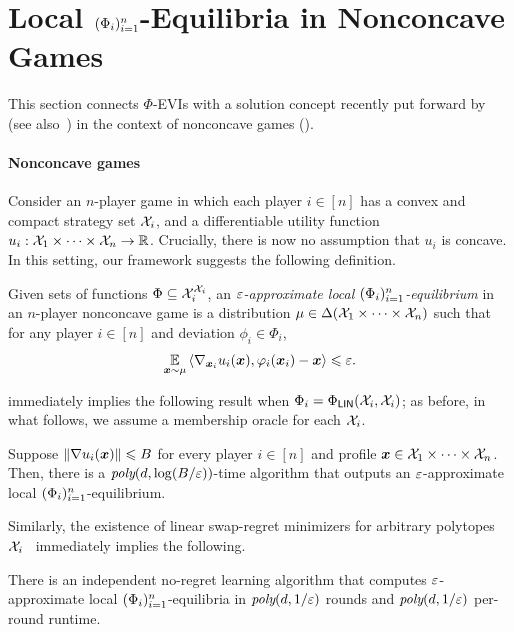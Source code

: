 \section{Local \texorpdfstring{$(\Phi_i)_{i=1}^n$}{Phi}-Equilibria in Nonconcave Games}
\label{sec:localPhi}

This section connects $\Phi$-EVIs with a solution concept recently put forward by~\citet{Cai24:Tractable} (see also~\citet{Ahunbay25:First}) in the context of nonconcave games ().

\paragraph{Nonconcave games} Consider an $n$-player game in which each player $i \in [n]$ has a convex and compact strategy set ${\mathcal{X}}_i$, and a differentiable utility function $u_i : {\mathcal{X}}_1 \times \dots \times {\mathcal{X}}_n \to \mathbb R$. Crucially, there is now no assumption that $u_i$ is concave. In this setting, our framework suggests the following definition.
\begin{definition}
    \label{def:localPhi}
    Given sets of functions $\Phi \subseteq  {\mathcal{X}}_i^{{\mathcal{X}}_i}$, an {\em $\varepsilon$-approximate local $(\Phi_i)_{i=1}^n$-equilibrium} in an $n$-player nonconcave game is a distribution $\mu \in \Delta({\mathcal{X}}_1 \times \dots \times {\mathcal{X}}_n)$ such that for any player $i \in [n]$ and deviation $\phi_i \in \Phi_i$,
    \begin{align*}
        \E_{\vx\sim\mu} \ip{\grad_{\vx_i} u_i(\vx), \phi_i(\vx_i) - \vx} \le \eps.
    \end{align*}
\end{definition}
 immediately implies the following result when $\Phi_i = \Phi_\mathsf{LIN}({\mathcal{X}}_i, {\mathcal{X}}_i)$; as before, in what follows, we assume a membership oracle for each ${\mathcal{X}}_i$.

\begin{corollary}\label{cor:nonconcave ellipsoid}
Suppose $\norm{\nabla u_i({\bm{x}})} \leqslant B$ for every player $i \in [n]$ and profile ${\bm{x}} \in {\mathcal{X}}_1 \times \dots \times {\mathcal{X}}_n$. Then, there is a $\textit{poly}(d, \log(B/\varepsilon))$-time algorithm that outputs an $\varepsilon$-approximate local $(\Phi_i)_{i=1}^n$-equilibrium.
\end{corollary}
Similarly, the existence of linear swap-regret minimizers for arbitrary polytopes ${\mathcal{X}}_i$~\citep{Daskalakis24:Efficient} immediately implies the following.

\begin{corollary}
    There is an independent no-regret learning algorithm that computes $\varepsilon$-approximate local $(\Phi_i)_{i=1}^n$-equilibria in $\textit{poly}(d, 1/\varepsilon)$ rounds and $\textit{poly}(d, 1/\varepsilon)$ per-round runtime.
\end{corollary}

